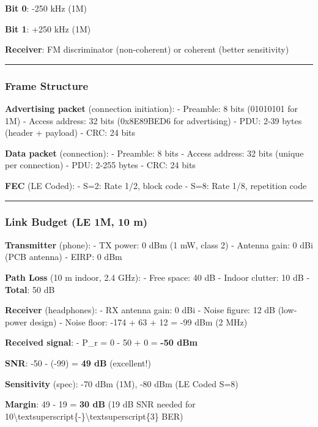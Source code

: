 \textbf{Bit 0}: -250 kHz (1M)

\textbf{Bit 1}: +250 kHz (1M)

\textbf{Receiver}: FM discriminator (non-coherent) or coherent (better
sensitivity)

\begin{center}\rule{0.5\linewidth}{0.5pt}\end{center}

\subsubsection{Frame Structure}\label{frame-structure-2}

\textbf{Advertising packet} (connection initiation): - Preamble: 8 bits
(01010101 for 1M) - Access address: 32 bits (0x8E89BED6 for advertising)
- PDU: 2-39 bytes (header + payload) - CRC: 24 bits

\textbf{Data packet} (connection): - Preamble: 8 bits - Access address:
32 bits (unique per connection) - PDU: 2-255 bytes - CRC: 24 bits

\textbf{FEC} (LE Coded): - S=2: Rate 1/2, block code - S=8: Rate 1/8,
repetition code

\begin{center}\rule{0.5\linewidth}{0.5pt}\end{center}

\subsubsection{Link Budget (LE 1M, 10 m)}\label{link-budget-le-1m-10-m}

\textbf{Transmitter} (phone): - TX power: 0 dBm (1 mW, class 2) -
Antenna gain: 0 dBi (PCB antenna) - EIRP: 0 dBm

\textbf{Path Loss} (10 m indoor, 2.4 GHz): - Free space: 40 dB - Indoor
clutter: 10 dB - \textbf{Total}: 50 dB

\textbf{Receiver} (headphones): - RX antenna gain: 0 dBi - Noise figure:
12 dB (low-power design) - Noise floor: -174 + 63 + 12 = -99 dBm (2 MHz)

\textbf{Received signal}: - P\_r = 0 - 50 + 0 = \textbf{-50 dBm}

\textbf{SNR}: -50 - (-99) = \textbf{49 dB} (excellent!)

\textbf{Sensitivity} (spec): -70 dBm (1M), -80 dBm (LE Coded S=8)

\textbf{Margin}: 49 - 19 = \textbf{30 dB} (19 dB SNR needed for
10\textbackslash textsuperscript\{-\}\textbackslash textsuperscript\{3\}
BER)

